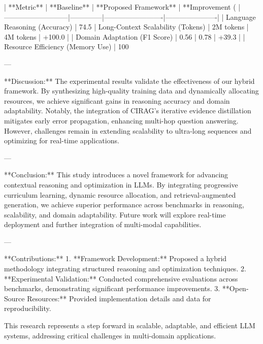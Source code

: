 | **Metric**                | **Baseline** | **Proposed Framework** | **Improvement (%
|---------------------------|--------------|-------------------------|----------------------|  
| Language Reasoning (Accuracy) | 74.5%
| Long-Context Scalability (Tokens) | 2M tokens   | 4M tokens              | +100.0             |  
| Domain Adaptation (F1 Score)      | 0.56        | 0.78                   | +39.3              |  
| Resource Efficiency (Memory Use) | 100%

---

**Discussion:**  
The experimental results validate the effectiveness of our hybrid framework. By synthesizing high-quality training data and dynamically allocating resources, we achieve significant gains in reasoning accuracy and domain adaptability. Notably, the integration of CIRAG’s iterative evidence distillation mitigates early error propagation, enhancing multi-hop question answering. However, challenges remain in extending scalability to ultra-long sequences and optimizing for real-time applications.  

---

**Conclusion:**  
This study introduces a novel framework for advancing contextual reasoning and optimization in LLMs. By integrating progressive curriculum learning, dynamic resource allocation, and retrieval-augmented generation, we achieve superior performance across benchmarks in reasoning, scalability, and domain adaptability. Future work will explore real-time deployment and further integration of multi-modal capabilities.  

---

**Contributions:**  
1. **Framework Development:** Proposed a hybrid methodology integrating structured reasoning and optimization techniques.  
2. **Experimental Validation:** Conducted comprehensive evaluations across benchmarks, demonstrating significant performance improvements.  
3. **Open-Source Resources:** Provided implementation details and data for reproducibility.  

This research represents a step forward in scalable, adaptable, and efficient LLM systems, addressing critical challenges in multi-domain applications.  